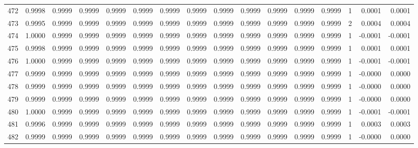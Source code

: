 \begin{tabular}{lrrrrrrrrrrrrrrr}
472 &      0.9998 &  0.9999 &  0.9999 &  0.9999 &  0.9999 &  0.9999 &  0.9999 &  0.9999 &  0.9999 &  0.9999 &   0.9999 &     0.9999 &      1 &                    0.0001 &                     0.0001 \\
473 &      0.9995 &  0.9999 &  0.9999 &  0.9999 &  0.9999 &  0.9999 &  0.9999 &  0.9999 &  0.9999 &  0.9999 &   0.9999 &     0.9999 &      2 &                    0.0004 &                     0.0004 \\
474 &      1.0000 &  0.9999 &  0.9999 &  0.9999 &  0.9999 &  0.9999 &  0.9999 &  0.9999 &  0.9999 &  0.9999 &   0.9999 &     0.9999 &      1 &                   -0.0001 &                    -0.0001 \\
475 &      0.9998 &  0.9999 &  0.9999 &  0.9999 &  0.9999 &  0.9999 &  0.9999 &  0.9999 &  0.9999 &  0.9999 &   0.9999 &     0.9999 &      1 &                    0.0001 &                     0.0001 \\
476 &      1.0000 &  0.9999 &  0.9999 &  0.9999 &  0.9999 &  0.9999 &  0.9999 &  0.9999 &  0.9999 &  0.9999 &   0.9999 &     0.9999 &      1 &                   -0.0001 &                    -0.0001 \\
477 &      0.9999 &  0.9999 &  0.9999 &  0.9999 &  0.9999 &  0.9999 &  0.9999 &  0.9999 &  0.9999 &  0.9999 &   0.9999 &     0.9999 &      1 &                   -0.0000 &                     0.0000 \\
478 &      0.9999 &  0.9999 &  0.9999 &  0.9999 &  0.9999 &  0.9999 &  0.9999 &  0.9999 &  0.9999 &  0.9999 &   0.9999 &     0.9999 &      1 &                   -0.0000 &                     0.0000 \\
479 &      0.9999 &  0.9999 &  0.9999 &  0.9999 &  0.9999 &  0.9999 &  0.9999 &  0.9999 &  0.9999 &  0.9999 &   0.9999 &     0.9999 &      1 &                   -0.0000 &                     0.0000 \\
480 &      1.0000 &  0.9999 &  0.9999 &  0.9999 &  0.9999 &  0.9999 &  0.9999 &  0.9999 &  0.9999 &  0.9999 &   0.9999 &     0.9999 &      1 &                   -0.0001 &                    -0.0001 \\
481 &      0.9996 &  0.9999 &  0.9999 &  0.9999 &  0.9999 &  0.9999 &  0.9999 &  0.9999 &  0.9999 &  0.9999 &   0.9999 &     0.9999 &      1 &                    0.0003 &                     0.0003 \\
482 &      0.9999 &  0.9999 &  0.9999 &  0.9999 &  0.9999 &  0.9999 &  0.9999 &  0.9999 &  0.9999 &  0.9999 &   0.9999 &     0.9999 &      1 &                   -0.0000 &                     0.0000 \\

\end{tabular}
